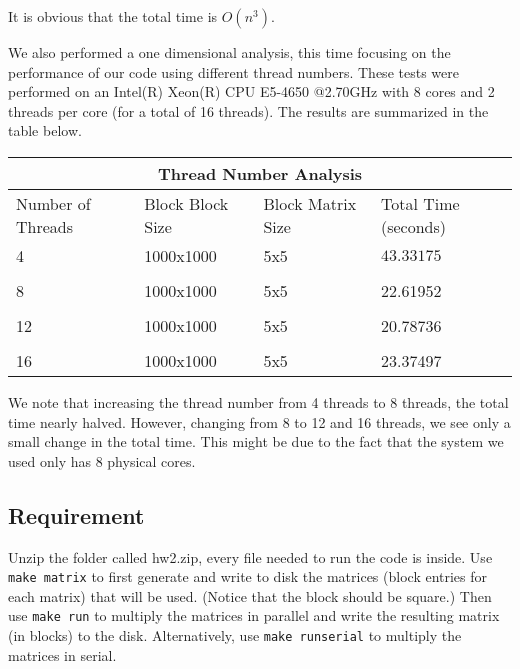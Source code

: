 \documentclass[12pt]{article}
\newcommand{\0}{\mathbf{0}}
\begin{document}
It is obvious that the total time is $O(n^3)$.
\bigskip

We also performed a one dimensional analysis, this time focusing on the performance of our code using different thread numbers. These tests were performed on an Intel(R) Xeon(R) CPU E5-4650 @2.70GHz with 8 cores and 2 threads per core (for a total of 16 threads). The results are summarized in the table below.

\begin{center}

    \begin{tabular}{ |p{2cm}| |p{2cm}| |p{2cm}||p{3cm}|}
	\hline
	\multicolumn{4}{|c|}{Thread Number Analysis} \\
	\hline
	Number of Threads& Block Block Size &Block Matrix Size & Total Time (seconds)  \\
	\hline
	4 & 1000x1000 &  5x5& $43.33175$   \\
	&  &  &  \\

	8& 1000x1000& 5x5 & 22.61952   \\ 

	& & &  \\

	12 & 1000x1000 & 5x5 & 20.78736  \\

	& & &  \\

	16 & 1000x1000 & 5x5 & 23.37497    \\


	\hline
    \end{tabular}

\end{center}

We note that increasing the thread number from 4 threads to 8 threads, the total time nearly halved. However, changing from 8 to 12 and 16 threads, we see only a small change in the total time. This might be due to the fact that the system we used only has 8 physical cores.
\subsection{Requirement}

Unzip the folder called hw2.zip, every file needed to run the code is inside. Use \texttt{make matrix} to first generate and write to disk the matrices (block entries for each matrix) that will be used. (Notice that the block should be square.) Then use \texttt{make run} to multiply the matrices in parallel and write the resulting matrix (in blocks) to the disk. Alternatively, use \texttt{make runserial} to multiply the matrices in serial. 
\end{document}
